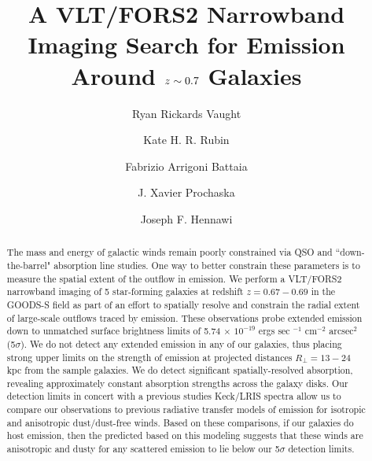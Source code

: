 \documentclass[twocolumn]{aastex61}
\begin{document}
\title{A VLT/FORS2 Narrowband Imaging Search for  Emission Around $\lowercase{z}\sim0.7$ Galaxies }
\author{Ryan Rickards Vaught}
 
 \author{Kate H. R. Rubin }
 
 \author{Fabrizio Arrigoni Battaia }

 \author{J. Xavier Prochaska}
 
\author{Joseph F. Hennawi}


\begin{abstract}

The mass and energy of galactic winds remain poorly constrained via QSO and ``down-the-barrel" absorption line studies. One way to better constrain these parameters is to measure the spatial extent of the outflow in emission. We perform a VLT/FORS2 narrowband imaging of 5 star-forming galaxies at redshift $z=0.67-0.69$ in the GOODS-S field as part of an effort to spatially resolve and constrain the radial extent of large-scale outflows traced by  emission. These observations probe extended  emission down to unmatched surface brightness limits of 5.74 $\times$ $10^{-19}$ ergs sec $^{-1}$ cm$^{-2}$ arcsec$^2$ (5$\sigma$).  We do not detect any extended  emission in any of our galaxies, thus placing strong upper limits on the strength of  emission at projected distances $R_{\perp} = 13-24$ kpc from the sample galaxies. We do detect significant spatially-resolved  absorption, revealing approximately constant absorption strengths across the galaxy disks. Our detection limits in concert with a previous studies Keck/LRIS spectra allow us to compare our observations to previous radiative transfer models of  emission for isotropic and anisotropic dust/dust-free winds. Based on these comparisons, if our galaxies do host  emission, then the predicted  based on this modeling suggests that these winds are anisotropic and dusty for any scattered  emission to lie below our 5$\sigma$ detection limits.

\end{abstract}
\end{document}
